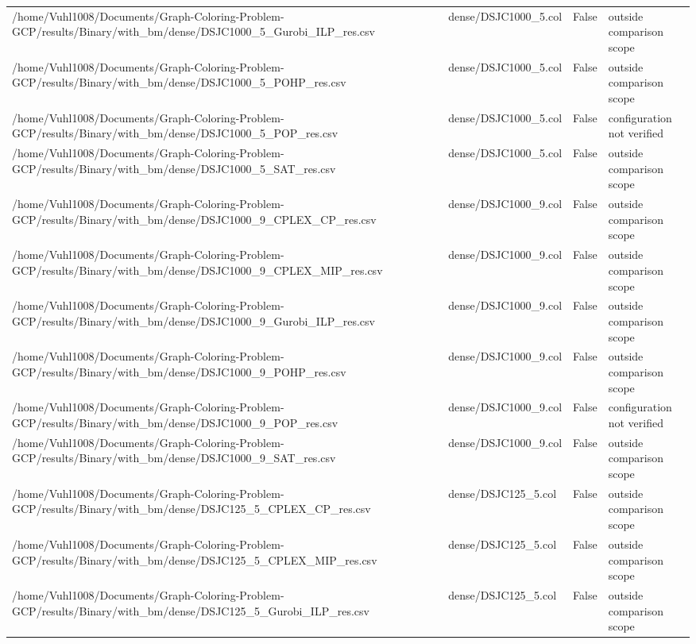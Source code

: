 \begin{table}[htbp]
\begin{tabular}{llll}
/home/Vuhl1008/Documents/Graph-Coloring-Problem-GCP/results/Binary/with\_bm/dense/DSJC1000\_5\_Gurobi\_ILP\_res.csv & dense/DSJC1000\_5.col & False & outside comparison scope \\
/home/Vuhl1008/Documents/Graph-Coloring-Problem-GCP/results/Binary/with\_bm/dense/DSJC1000\_5\_POHP\_res.csv & dense/DSJC1000\_5.col & False & outside comparison scope \\
/home/Vuhl1008/Documents/Graph-Coloring-Problem-GCP/results/Binary/with\_bm/dense/DSJC1000\_5\_POP\_res.csv & dense/DSJC1000\_5.col & False & configuration not verified \\
/home/Vuhl1008/Documents/Graph-Coloring-Problem-GCP/results/Binary/with\_bm/dense/DSJC1000\_5\_SAT\_res.csv & dense/DSJC1000\_5.col & False & outside comparison scope \\
/home/Vuhl1008/Documents/Graph-Coloring-Problem-GCP/results/Binary/with\_bm/dense/DSJC1000\_9\_CPLEX\_CP\_res.csv & dense/DSJC1000\_9.col & False & outside comparison scope \\
/home/Vuhl1008/Documents/Graph-Coloring-Problem-GCP/results/Binary/with\_bm/dense/DSJC1000\_9\_CPLEX\_MIP\_res.csv & dense/DSJC1000\_9.col & False & outside comparison scope \\
/home/Vuhl1008/Documents/Graph-Coloring-Problem-GCP/results/Binary/with\_bm/dense/DSJC1000\_9\_Gurobi\_ILP\_res.csv & dense/DSJC1000\_9.col & False & outside comparison scope \\
/home/Vuhl1008/Documents/Graph-Coloring-Problem-GCP/results/Binary/with\_bm/dense/DSJC1000\_9\_POHP\_res.csv & dense/DSJC1000\_9.col & False & outside comparison scope \\
/home/Vuhl1008/Documents/Graph-Coloring-Problem-GCP/results/Binary/with\_bm/dense/DSJC1000\_9\_POP\_res.csv & dense/DSJC1000\_9.col & False & configuration not verified \\
/home/Vuhl1008/Documents/Graph-Coloring-Problem-GCP/results/Binary/with\_bm/dense/DSJC1000\_9\_SAT\_res.csv & dense/DSJC1000\_9.col & False & outside comparison scope \\
/home/Vuhl1008/Documents/Graph-Coloring-Problem-GCP/results/Binary/with\_bm/dense/DSJC125\_5\_CPLEX\_CP\_res.csv & dense/DSJC125\_5.col & False & outside comparison scope \\
/home/Vuhl1008/Documents/Graph-Coloring-Problem-GCP/results/Binary/with\_bm/dense/DSJC125\_5\_CPLEX\_MIP\_res.csv & dense/DSJC125\_5.col & False & outside comparison scope \\
/home/Vuhl1008/Documents/Graph-Coloring-Problem-GCP/results/Binary/with\_bm/dense/DSJC125\_5\_Gurobi\_ILP\_res.csv & dense/DSJC125\_5.col & False & outside comparison scope \\

\end{tabular}
\end{table}
